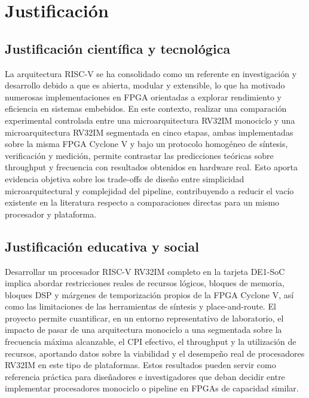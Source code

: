 \section{Justificación}
\label{sec:justificacion}


\subsection{Justificación científica y tecnológica} 
La arquitectura RISC-V se ha consolidado como un referente en investigación y desarrollo debido a que es abierta, modular y extensible, lo que ha motivado numerosas implementaciones en FPGA orientadas a explorar rendimiento y eficiencia en sistemas embebidos. En este contexto, realizar una comparación experimental controlada entre una microarquitectura RV32IM monociclo y una microarquitectura RV32IM segmentada en cinco etapas, ambas implementadas sobre la misma FPGA Cyclone V y bajo un protocolo homogéneo de síntesis, verificación y medición, permite contrastar las predicciones teóricas sobre throughput y frecuencia con resultados obtenidos en hardware real. Esto aporta evidencia objetiva sobre los trade-offs de diseño entre simplicidad microarquitectural y complejidad del pipeline, contribuyendo a reducir el vacío existente en la literatura respecto a comparaciones directas  para un mismo procesador y plataforma.

\subsection{Justificación educativa y social} 
Desarrollar un procesador RISC-V RV32IM completo en la tarjeta DE1-SoC implica abordar restricciones reales de recursos lógicos, bloques de memoria, bloques DSP y márgenes de temporización propios de la FPGA Cyclone V, así como las limitaciones de las herramientas de síntesis y place-and-route. El proyecto permite cuantificar, en un entorno representativo de laboratorio, el impacto de pasar de una arquitectura monociclo a una segmentada sobre la frecuencia máxima alcanzable, el CPI efectivo, el throughput y la utilización de recursos, aportando datos sobre la viabilidad y el desempeño real de procesadores RV32IM en este tipo de plataformas. Estos resultados pueden servir como referencia práctica para diseñadores e investigadores que deban decidir entre implementar procesadores monociclo o pipeline en FPGAs de capacidad similar.

